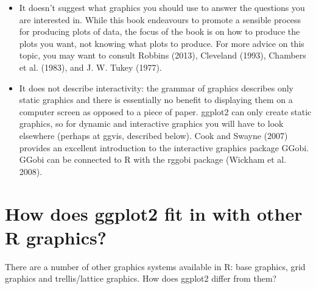 \begin{itemize}
\item
  It doesn't suggest what graphics you should use to answer the
  questions you are interested in. While this book endeavours to promote
  a sensible process for producing plots of data, the focus of the book
  is on how to produce the plots you want, not knowing what plots to
  produce. For more advice on this topic, you may want to consult
  Robbins (2013), Cleveland (1993), Chambers et al. (1983), and J. W.
  Tukey (1977).
\item
  It does not describe interactivity: the grammar of graphics describes
  only static graphics and there is essentially no benefit to displaying
  them on a computer screen as opposed to a piece of paper. ggplot2 can
  only create static graphics, so for dynamic and interactive graphics
  you will have to look elsewhere (perhaps at ggvis, described below).
  Cook and Swayne (2007) provides an excellent introduction to the
  interactive graphics package GGobi. GGobi can be connected to R with
  the rggobi package (Wickham et al. 2008).
\end{itemize}

\section{How does ggplot2 fit in with other R
graphics?}\label{how-does-ggplot2-fit-in-with-other-r-graphics}

There are a number of other graphics systems available in R: base
graphics, grid graphics and trellis/lattice graphics. How does ggplot2
differ from them?

